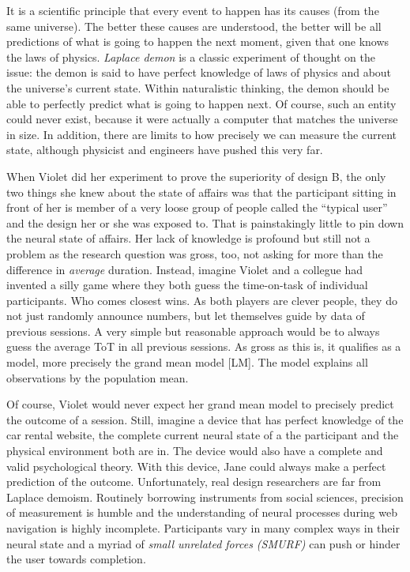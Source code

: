 \documentclass[]{svmono}
\theoremstyle{definition}
\theoremstyle{definition}
\theoremstyle{definition}
\theoremstyle{remark}
\begin{document}
It is a scientific principle that every event to happen has its causes
(from the same universe). The better these causes are understood, the
better will be all predictions of what is going to happen the next
moment, given that one knows the laws of physics. \emph{Laplace demon}
is a classic experiment of thought on the issue: the demon is said to
have perfect knowledge of laws of physics and about the universe's
current state. Within naturalistic thinking, the demon should be able to
perfectly predict what is going to happen next. Of course, such an
entity could never exist, because it were actually a computer that
matches the universe in size. In addition, there are limits to how
precisely we can measure the current state, although physicist and
engineers have pushed this very far.

When Violet did her experiment to prove the superiority of design B, the
only two things she knew about the state of affairs was that the
participant sitting in front of her is member of a very loose group of
people called the ``typical user'' and the design her or she was exposed
to. That is painstakingly little to pin down the neural state of
affairs. Her lack of knowledge is profound but still not a problem as
the research question was gross, too, not asking for more than the
difference in \emph{average} duration. Instead, imagine Violet and a
collegue had invented a silly game where they both guess the
time-on-task of individual participants. Who comes closest wins. As both
players are clever people, they do not just randomly announce numbers,
but let themselves guide by data of previous sessions. A very simple but
reasonable approach would be to always guess the average ToT in all
previous sessions. As gross as this is, it qualifies as a model, more
precisely the grand mean model {[}LM{]}. The model explains all
observations by the population mean.

Of course, Violet would never expect her grand mean model to precisely
predict the outcome of a session. Still, imagine a device that has
perfect knowledge of the car rental website, the complete current neural
state of a the participant and the physical environment both are in. The
device would also have a complete and valid psychological theory. With
this device, Jane could always make a perfect prediction of the outcome.
Unfortunately, real design researchers are far from Laplace demoism.
Routinely borrowing instruments from social sciences, precision of
measurement is humble and the understanding of neural processes during
web navigation is highly incomplete. Participants vary in many complex
ways in their neural state and a myriad of \emph{small unrelated forces
(SMURF)} can push or hinder the user towards completion.
\end{document}
